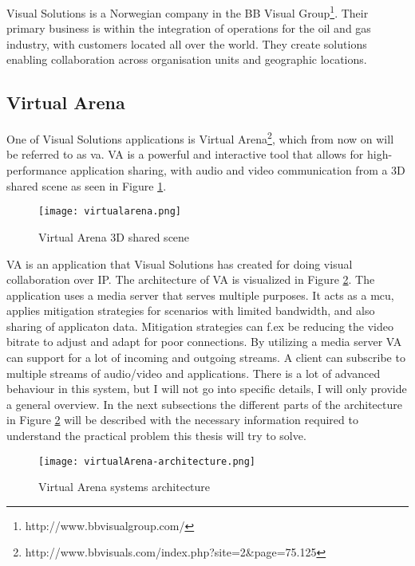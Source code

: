 Visual Solutions is a Norwegian company in the BB Visual Group\footnote{http://www.bbvisualgroup.com/}. Their primary business is within the integration of operations for the oil and gas industry, with customers located all over the world. They create solutions enabling collaboration across organisation units and geographic locations.

\subsection{Virtual Arena}
One of Visual Solutions applications is Virtual Arena\footnote{http://www.bbvisuals.com/index.php?site=2\&page=75.125}, which from now on will be referred to as \gls{va}. VA is a powerful and interactive tool that allows for high-performance application sharing, with audio and video communication from a 3D shared scene as seen in Figure \ref{fig:vsva-3d-scene}.
\\
\begin{figure}[here]
\centerline{\texttt{[image: virtualarena.png]}}
\caption{Virtual Arena 3D shared scene}
\label{fig:vsva-3d-scene}
\end{figure}


VA is an application that Visual Solutions has created for doing visual collaboration over IP. The architecture of VA is visualized in Figure \ref{fig:vsva-architecture}. The application uses a media server that serves multiple purposes. It acts as a \gls{mcu}, applies mitigation strategies for scenarios with limited bandwidth, and also sharing of applicaton data. Mitigation strategies can f.ex be reducing the video bitrate to adjust and adapt for poor connections. By utilizing a media server VA can support for a lot of incoming and outgoing streams. A client can subscribe to multiple streams of audio/video and applications. There is a lot of advanced behaviour in this system, but I will not go into specific details, I will only provide a general overview. In the next subsections the different parts of the architecture in Figure \ref{fig:vsva-architecture} will be described with the necessary information required to understand the practical problem this thesis will try to solve. 

\begin{figure}[here]
\centerline{\texttt{[image: virtualArena-architecture.png]}}
\caption{Virtual Arena systems architecture}
\label{fig:vsva-architecture}
\end{figure}

